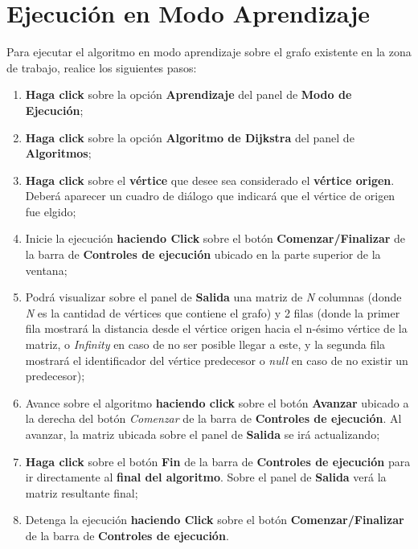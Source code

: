 \documentclass{book}
\begin{document}
\section{Ejecución en Modo Aprendizaje}

Para ejecutar el algoritmo en modo aprendizaje sobre el grafo existente en la zona de trabajo, realice los siguientes pasos:
\medskip

\begin{enumerate}
	\itemsep=8pt \topsep=0pt \partopsep=0pt \parskip=0pt \parsep=0pt

	\item \textbf{Haga click} sobre la opción \textbf{Aprendizaje} del panel de \textbf{Modo de Ejecución};

	\item \textbf{Haga click} sobre la opción \textbf{Algoritmo de Dijkstra} del panel de \textbf{Algoritmos};

	\item \textbf{Haga click} sobre el \textbf{vértice} que desee sea considerado el \textbf{vértice origen}. Deberá aparecer un cuadro de diálogo que indicará que el vértice de origen fue elgido;

	\item Inicie la ejecución \textbf{haciendo Click} sobre el botón \textbf{Comenzar/Finalizar} de la barra de \textbf{Controles de ejecución} ubicado en la parte superior de la ventana;

	\item Podrá visualizar sobre el panel de \textbf{Salida} una matriz de \textit{N} columnas (donde \textit{N} es la cantidad de vértices que contiene el grafo) y 2 filas (donde la primer fila mostrará la distancia desde el vértice origen hacia el n-ésimo vértice de la matriz, o \textit{Infinity} en caso de no ser posible llegar a este, y la segunda fila mostrará el identificador del vértice predecesor o \textit{null} en caso de no existir un predecesor);

	\item Avance sobre el algoritmo \textbf{haciendo click} sobre el botón \textbf{Avanzar} ubicado a la derecha del botón \textit{Comenzar} de la barra de \textbf{Controles de ejecución}. Al avanzar, la matriz ubicada sobre el panel de \textbf{Salida} se irá actualizando;

	\item \textbf{Haga click} sobre el botón \textbf{Fin} de la barra de \textbf{Controles de ejecución} para ir directamente al \textbf{final del algoritmo}. Sobre el panel de \textbf{Salida} verá la matriz resultante final;

	\item Detenga la ejecución \textbf{haciendo Click} sobre el botón \textbf{Comenzar/Finalizar} de la barra de \textbf{Controles de ejecución}.

\end{enumerate}
\medskip
\end{document}
